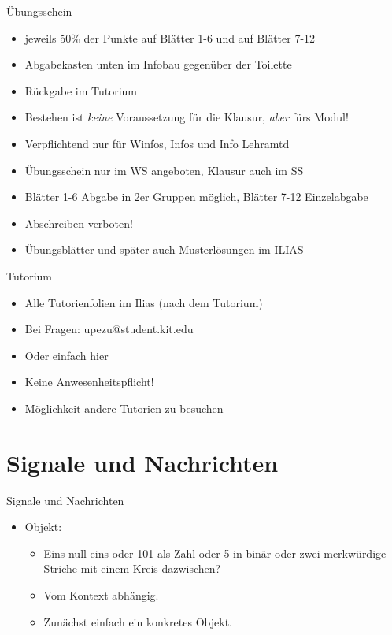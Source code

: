 \documentclass{beamer}
\begin{document}
\begin{frame}{Übungsschein}
	\begin{itemize}
		 
		\item jeweils 50\% der Punkte auf Blätter 1-6 und auf Blätter 7-12
		\item Abgabekasten unten im Infobau gegenüber der Toilette
		\item Rückgabe im Tutorium 
		\item Bestehen ist \emph{keine} Voraussetzung für die Klausur, \emph{aber} fürs Modul! 
		\item Verpflichtend nur für Winfos, Infos und Info Lehramtd
		\item Übungsschein nur im WS angeboten, Klausur auch im SS
		\item Blätter 1-6 Abgabe in 2er Gruppen möglich, Blätter 7-12 Einzelabgabe
		\item Abschreiben verboten!
		\item Übungsblätter und später auch Musterlösungen im ILIAS
	\end{itemize}
\end{frame}

\begin{frame}{Tutorium}
	\begin{itemize}
		\item Alle Tutorienfolien im Ilias (nach dem Tutorium)
	\end{itemize}
	 
	
	\begin{itemize}
		\item Bei Fragen: upezu@student.kit.edu 
		\item Oder einfach hier
		\item Keine Anwesenheitspflicht! 
		\item Möglichkeit andere Tutorien zu besuchen
	\end{itemize}
\end{frame}


\section{Signale und Nachrichten}

\begin{frame}{Signale und Nachrichten}
	\begin{itemize}
		 \item Objekt: 
		\begin{itemize}
			 \item Eins null eins oder 101 als Zahl oder 5 in binär oder zwei merkwürdige Striche mit einem Kreis dazwischen?
			 \item Vom Kontext abhängig.
			 \item Zunächst einfach ein konkretes Objekt.
		\end{itemize}
	\end{itemize}
\end{frame}
\end{document}
